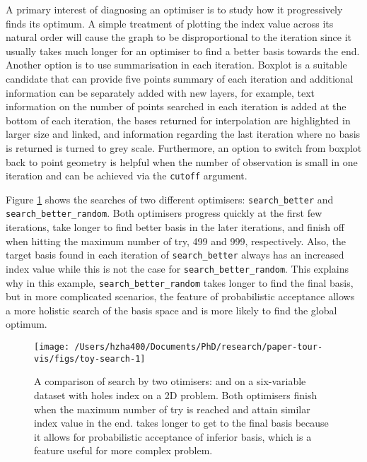 A primary interest of diagnosing an optimiser is to study how it
progressively finds its optimum. A simple treatment of plotting the
index value across its natural order will cause the graph to be
disproportional to the iteration since it usually takes much longer for
an optimiser to find a better basis towards the end. Another option is
to use summarisation in each iteration. Boxplot is a suitable candidate
that can provide five points summary of each iteration and additional
information can be separately added with new layers, for example, text
information on the number of points searched in each iteration is added
at the bottom of each iteration, the bases returned for interpolation
are highlighted in larger size and linked, and information regarding the
last iteration where no basis is returned is turned to grey scale.
Furthermore, an option to switch from boxplot back to point geometry is
helpful when the number of observation is small in one iteration and can
be achieved via the \texttt{cutoff} argument.

Figure \ref{fig:toy-search} shows the searches of two different
optimisers: \texttt{search\_better} and \texttt{search\_better\_random}.
Both optimisers progress quickly at the first few iterations, take
longer to find better basis in the later iterations, and finish off when
hitting the maximum number of try, 499 and 999, respectively. Also, the
target basis found in each iteration of \texttt{search\_better} always
has an increased index value while this is not the case for
\texttt{search\_better\_random}. This explains why in this example,
\texttt{search\_better\_random} takes longer to find the final basis,
but in more complicated scenarios, the feature of probabilistic
acceptance allows a more holistic search of the basis space and is more
likely to find the global optimum.

\begin{Schunk}
\begin{figure}

{\centering \texttt{[image: /Users/hzha400/Documents/PhD/research/paper-tour-vis/figs/toy-search-1]} 

}

\caption{A comparison of search by two otimisers:  and  on a six-variable dataset  with holes index on a 2D problem. Both optimisers finish when the maximum number of try is reached and attain similar index value in the end.  takes longer to get to the final basis because it allows for probabilistic acceptance of inferior basis, which is a feature useful for more complex problem.}\label{fig:toy-search}
\end{figure}
\end{Schunk}

